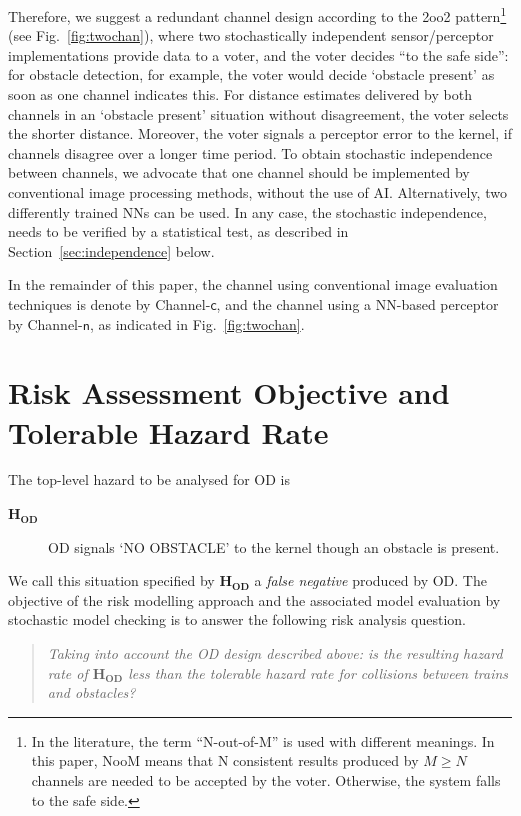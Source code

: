 \documentclass[runningheads,a4paper]{llncs}
\begin{document}
Therefore, we suggest a redundant channel design according to the 2oo2 pattern\footnote{In the literature, the term 
``N-out-of-M'' is used with different meanings. In this paper, NooM means that N consistent results produced by $M\ge N$ channels are needed to be accepted by the voter. Otherwise, the system falls to the safe side.} (see Fig.~\ref{fig:twochan}), where two stochastically independent sensor/perceptor implementations provide data to a voter, and the voter decides ``to the safe side'': for obstacle detection, for example, the voter would decide `obstacle present' as soon as   one channel indicates this. For distance estimates delivered by both channels in an `obstacle present' situation without disagreement, the voter selects  the shorter distance. Moreover, the voter signals  a perceptor error   to the kernel, if channels disagree over a longer time period.
To obtain stochastic independence between channels, we advocate that one channel should be implemented by conventional image processing methods, without the use of AI. Alternatively, two differently trained NNs can be used. In any case, the stochastic independence, needs to be verified by a statistical test, as described in Section~\ref{sec:independence} below.

In the remainder of this paper, the channel using conventional image evaluation techniques is denote by Channel-$\mathsf{c}$, and the channel using a NN-based perceptor by Channel-$\mathsf{n}$, as indicated in Fig.~\ref{fig:twochan}.

 

\section{Risk Assessment Objective and Tolerable Hazard Rate}\label{sec:THR}
 
 
The top-level hazard to be analysed  for OD is 
\begin{description}
\item[$\mathbf{H}_\mathbf{OD}$] OD signals `NO OBSTACLE' to the kernel though an obstacle is present.
\end{description}
We call this situation specified by $\mathbf{H}_\mathbf{OD}$ a \emph{false negative} produced by OD.
The objective of the risk modelling approach and the associated model evaluation by stochastic model checking is to answer the following risk analysis question.
\begin{quote}
\sl Taking into account the OD design described above: is the resulting hazard rate of $\mathbf{H}_\mathbf{OD}$ less than the tolerable hazard rate for collisions between trains and obstacles?
\end{quote}
\end{document}
